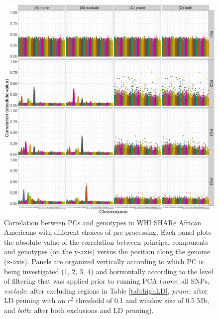 \documentclass[12pt]{article}
\begin{document}
\begin{figure}
\center
\includegraphics[width=\textwidth]{figs/finalfigs/fig3_pc_geno_corr}
\caption{Correlation between PCs and genotypes in WHI SHARe African Americans with different choices of pre-processing. Each panel plots the absolute value of the correlation between principal components and genotypes (on the y-axis) versus the position along the genome (x-axis).  Panels are organized vertically according to which PC is being investigated (1, 2, 3, 4) and horizontally according to the level of filtering that was applied prior to running PCA (\textit{none}: all SNPs, \textit{exclude}: after excluding regions in Table \ref{tab:highLD}, \textit{prune}: after LD pruning with an $r^2$ threshold of 0.1 and window size of 0.5 Mb, and \textit{both}: after both exclusions and LD pruning).}
\label{fig:corr-compare}
\end{figure}


\end{document}
